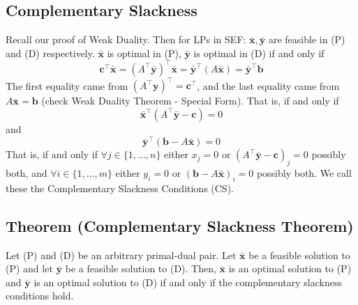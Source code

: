 \subsection{Complementary Slackness}
Recall our proof of Weak Duality. Then for LPs in SEF: 
$ \bm{\bar{x}}, \bm{\bar{y}} $ are feasible in (P) and (D) respectively.
$ \bm{\bar{x}} $ is optimal in (P), $ \bm{\bar{y}} $ is optimal in
(D)  if and only if
\[ \bm{c} ^\top \bm{\bar{x}}=(A^\top \bm{\bar{y}})^\top \bm{\bar{x}}=\bm{\bar{y}}^\top(A \bm{\bar{x}})=
\bm{\bar{y}}^\top \bm{b} \]
The first equality came from $ (A ^\top \bm{y})^\top=\bm{c}^\top $, and the
last equality came from $ A \bm{\bar{x}}=\bm{b} $ (check Weak Duality Theorem -
Special Form).
That is, if and only if
\[ \bm{\bar{x}}^\top(A ^\top \bm{\bar{y}}-\bm{c})=0 \]
and
\[ \bm{\bar{y}}^\top(\bm{b}-A \bm{\bar{x}})=0 \]
That is, if and only if $ \forall j\in \{1,\ldots,n\} $ either
$ x_j=0 $ or $ (A ^\top \bm{\bar{y}}-\bm{c})_j=0 $ possibly
both, and $ \forall i\in \{1,\ldots,m\} $ either $ y_i=0 $
or $ (\bm{b}-A \bm{\bar{x}})_i=0 $ possibly both. We call these
the Complementary Slackness Conditions (CS).

\begin{thmbox}
    \subsection{Theorem (Complementary Slackness Theorem)}
    Let (P) and (D) be an arbitrary primal-dual pair. Let
    $ \bm{\bar{x}} $ be a feasible solution to (P) and let
    $ \bm{\bar{y}} $ be a feasible solution to (D). Then,
    $ \bm{\bar{x}} $ is an optimal solution to (P) and
    $ \bm{\bar{y}} $ is an optimal solution to (D) if and only if
    the complementary slackness conditions hold.
\end{thmbox}

